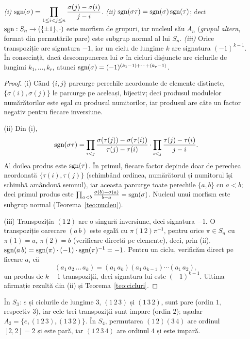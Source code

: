 \begin{teorema}\label{teo:sgn}
\emph{(i)} $\operatorname{sgn}(\sigma)=\displaystyle\prod_{1\le i<j\le n}\frac{\sigma(j)-\sigma(i)}{j-i}$.
\emph{(ii)} $\operatorname{sgn}(\sigma\tau)=\operatorname{sgn}(\sigma)\operatorname{sgn}(\tau)$; deci $\operatorname{sgn}:S_n\to(\{\pm1\},\cdot)$ este morfism de grupuri, iar nucleul său $A_n$ (\emph{grupul altern}, format din permutările pare) este subgrup normal al lui $S_n$.
\emph{(iii)} Orice transpoziție are signatura $-1$, iar un ciclu de lungime $k$ are signatura $(-1)^{k-1}$. În consecință, dacă descompunerea lui $\sigma$ în cicluri disjuncte are ciclurile de lungimi $k_1,\dots,k_r$, atunci $\operatorname{sgn}(\sigma)=(-1)^{(k_1-1)+\dots+(k_r-1)}$.
\end{teorema}

\begin{proof}
(i) Când $\{i,j\}$ parcurge perechile neordonate de elemente distincte, $\{\sigma(i),\sigma(j)\}$ le parcurge pe aceleași, bijectiv; deci produsul modulelor numărătorilor este egal cu produsul numitorilor, iar produsul are câte un factor negativ pentru fiecare inversiune.

(ii) Din (i),
\[
\operatorname{sgn}(\sigma\tau)=\prod_{i<j}\frac{\sigma(\tau(j))-\sigma(\tau(i))}{\tau(j)-\tau(i)}\cdot\prod_{i<j}\frac{\tau(j)-\tau(i)}{j-i}.
\]
Al doilea produs este $\operatorname{sgn}(\tau)$. În primul, fiecare factor depinde doar de perechea neordonată $\{\tau(i),\tau(j)\}$ (schimbând ordinea, numărătorul și numitorul își schimbă amândouă semnul), iar aceasta parcurge toate perechile $\{a,b\}$ cu $a<b$; deci primul produs este $\prod_{a<b}\frac{\sigma(b)-\sigma(a)}{b-a}=\operatorname{sgn}(\sigma)$. Nucleul unui morfism este subgrup normal (Teorema~\ref{teo:nucleu}).

(iii) Transpoziția $(1\,2)$ are o singură inversiune, deci signatura $-1$. O transpoziție oarecare $(a\,b)$ este egală cu $\pi(1\,2)\pi^{-1}$, pentru orice $\pi\in S_n$ cu $\pi(1)=a$, $\pi(2)=b$ (verificare directă pe elemente), deci, prin (ii), $\operatorname{sgn}(a\,b)=\operatorname{sgn}(\pi)\cdot(-1)\cdot\operatorname{sgn}(\pi)^{-1}=-1$. Pentru un ciclu, verificăm direct pe fiecare $a_i$ că
\[
(a_1\,a_2\,\dots\,a_k)=(a_1\,a_k)(a_1\,a_{k-1})\cdots(a_1\,a_2),
\]
un produs de $k-1$ transpoziții, deci signatura lui este $(-1)^{k-1}$. Ultima afirmație rezultă din (ii) și Teorema~\ref{teo:cicluri}.
\end{proof}

\begin{exemplu}
În $S_3$: $e$ și ciclurile de lungime $3$, $(1\,2\,3)$ și $(1\,3\,2)$, sunt pare (ordin $1$, respectiv $3$), iar cele trei transpoziții sunt impare (ordin $2$); așadar $A_3=\{e,(1\,2\,3),(1\,3\,2)\}$. În $S_4$, permutarea $(1\,2)(3\,4)$ are ordinul $[2,2]=2$ și este pară, iar $(1\,2\,3\,4)$ are ordinul $4$ și este impară.
\end{exemplu}

